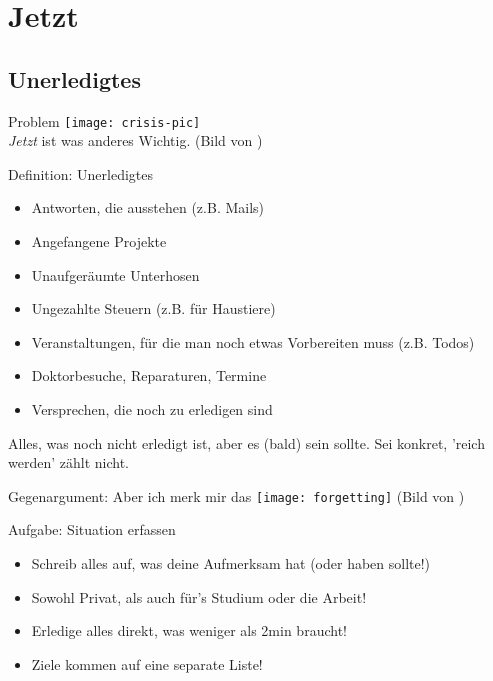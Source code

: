 \section{Jetzt}

\subsection{Unerledigtes}

\begin{frame}[c]{Problem}
    \texttt{[image: crisis-pic]} \\
    {\em Jetzt} ist was anderes Wichtig. (Bild von \cite{crisis-pic})
\end{frame}


\begin{frame}[c]{Definition: Unerledigtes}
    \begin{itemize}[<+(1)->]
        \item Antworten, die ausstehen (z.B. Mails)
        \item Angefangene Projekte
        \item Unaufgeräumte Unterhosen
        \item Ungezahlte Steuern (z.B. für Haustiere)
        \item Veranstaltungen, für die man noch etwas Vorbereiten muss (z.B. Todos)
        \item Doktorbesuche, Reparaturen, Termine
        \item Versprechen, die noch zu erledigen sind
    \end{itemize}
    \pause
    Alles, was noch nicht erledigt ist, aber es (bald) sein
    sollte. Sei konkret, 'reich werden' zählt nicht.
\end{frame}



\begin{frame}[c]{Gegenargument: Aber ich merk mir das}
    \pause
    \texttt{[image: forgetting]}
    (Bild von \cite{forgetting-pic})
\end{frame}


\begin{frame}[c]{Aufgabe: Situation erfassen}
    \Large
    \begin{itemize}[<+(1)->]
        \item Schreib alles auf, was deine Aufmerksam hat (oder haben sollte!)
        \item Sowohl Privat, als auch für's Studium oder die Arbeit!
        \item Erledige alles direkt, was weniger als 2min braucht!
        \item Ziele kommen auf eine separate Liste!
    \end{itemize}
\end{frame}


